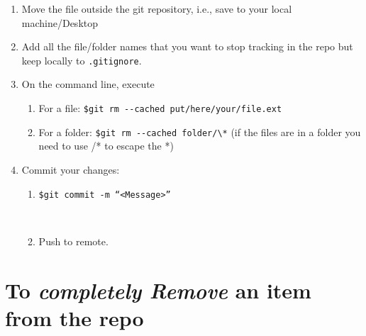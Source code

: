 \documentclass[
  letterpaper,
  DIV=11,
  numbers=noendperiod]{scrreprt}
\providecommand{\tightlist}{%
  \setlength{\itemsep}{0pt}\setlength{\parskip}{0pt}}\usepackage{longtable,booktabs,array}
\begin{document}
\begin{enumerate}
\def\labelenumi{\arabic{enumi}.}
\tightlist
\item
  Move the file outside the git repository, i.e., save to your local
  machine/Desktop\\
\item
  Add all the file/folder names that you want to stop tracking in the
  repo but keep locally to \texttt{.gitignore}.\\
\item
  On the command line, execute

  \begin{enumerate}
  \def\labelenumii{\alph{enumii}.}
  \tightlist
  \item
    For a file: \texttt{\$git\ rm\ -\/-cached\ put/here/your/file.ext}\\
  \item
    For a folder:
    \texttt{\$git\ rm\ -\/-cached\ folder/\textbackslash{}*} (if the
    files are in a folder you need to use /* to escape the *)\\
  \end{enumerate}
\item
  Commit your changes:

  \begin{enumerate}
  \def\labelenumii{\alph{enumii}.}
  \tightlist
  \item
    \texttt{\$git\ commit\ -m\ “\textless{}Message\textgreater{}”}\strut \\
  \item
    Push to remote.
  \end{enumerate}
\end{enumerate}

\section{\texorpdfstring{To \emph{completely Remove} an item from the
repo}{To completely Remove an item from the repo}}\label{to-completely-remove-an-item-from-the-repo}
\end{document}
